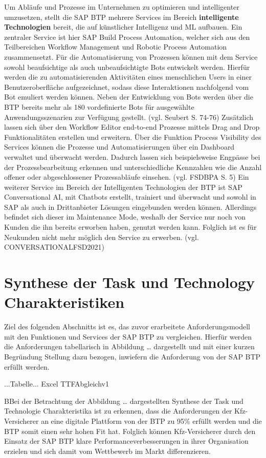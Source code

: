 Um Abläufe und Prozesse im Unternehmen zu optimieren und intelligenter umzusetzen, stellt die SAP BTP mehrere Services im Bereich \textbf{intelligente Technologien} bereit, die auf künstlicher Intelligenz und ML aufbauen.  Ein zentraler Service ist hier SAP Build Process Automation, welcher sich aus den Teilbereichen Workflow Management und Robotic Process Automation zusammensetzt. Für die Automatisierung von Prozessen können mit dem Service sowohl beaufsichtige als auch unbeaufsichtigte Bots entwickelt werden. Hierfür werden die zu automatisierenden Aktivitäten eines menschlichen Users in einer Benutzeroberfläche aufgezeichnet, sodass diese Interaktionen nachfolgend vom Bot emuliert werden können. Neben der Entwicklung von Bots werden über die BTP bereits mehr als 180 vordefinierte Bots für ausgewählte Anwendungsszenarien zur Verfügung gestellt. (vgl. Seubert S. 74-76) Zusätzlich lassen sich über den Workflow Editor end-to-end Prozesse mittels Drag and Drop Funktionalitäten erstellen und erweitern. Über die Funktion Process Visibility des Services können die Prozesse und Automatisierungen über ein Dashboard verwaltet und überwacht werden. Dadurch lassen sich beispielsweise Engpässe bei der Prozessbearbeitung erkennen und unterschiedliche Kennzahlen wie die Anzahl offener oder abgeschlossener Prozessabläufe einsehen. (vgl. FSDBPA S. 5)
Ein weiterer Service im Bereich der Intelligenten Technologien der BTP ist SAP Conversational AI, mit Chatbots erstellt, trainiert und überwacht und sowohl in SAP als auch in Drittanbieter Lösungen eingebunden werden können. Allerdings befindet sich dieser im Maintenance Mode, weshalb der Service nur noch von Kunden die ihn bereits erworben haben, genutzt werden kann. Folglich ist es für Neukunden nicht mehr möglich den Service zu erwerben. (vgl. CONVERSATIONALFSD2021)









\section{Synthese der Task und Technology Charakteristiken}

Ziel des folgenden Abschnitts ist es, das zuvor erarbeitete Anforderungsmodell mit den Funktionen und Services der SAP BTP zu vergleichen. Hierfür werden die Anforderungen tabellarisch in Abbildung … dargestellt und mit einer kurzen Begründung Stellung dazu bezogen, inwiefern die Anforderung von der SAP BTP erfüllt werden.


...Tabelle... Excel TTFAbgleichv1

\newpage

BBei der Betrachtung der Abbildung … dargestellten Synthese der Task und Technologie Charakteristika ist zu erkennen, dass die Anforderungen der Kfz-Versicherer an eine digitale Plattform von der BTP zu 95\% erfüllt werden und die BTP somit einen sehr hohen Fit hat. Folglich können Kfz-Versicherer durch den Einsatz der SAP BTP klare Performanceverbesserungen in ihrer Organisation erzielen und sich damit vom Wettbewerb im Markt differenzieren.


\newpage